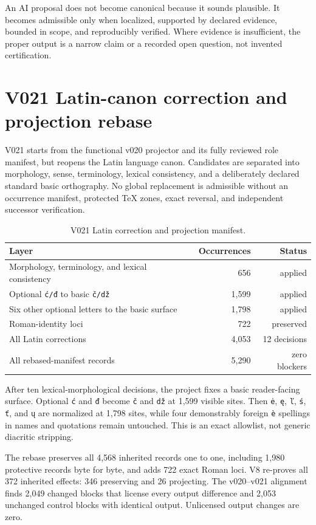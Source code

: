 \documentclass[11pt]{article}
\newcommand{\code}[1]{\texttt{#1}}
\begin{document}
An AI proposal does not become canonical because it sounds plausible. It becomes admissible only when localized, supported by declared evidence, bounded in scope, and reproducibly verified. Where evidence is insufficient, the proper output is a narrow claim or a recorded open question, not invented certification.

\section{V021 Latin-canon correction and projection rebase}

V021 starts from the functional v020 projector and its fully reviewed role manifest, but reopens the Latin language canon. Candidates are separated into morphology, sense, terminology, lexical consistency, and a deliberately declared standard basic orthography. No global replacement is admissible without an occurrence manifest, protected TeX zones, exact reversal, and independent successor verification.

\begin{table}[ht]
\centering
\caption{V021 Latin correction and projection manifest.}\label{tab:en-review}
\begin{tabular}{@{}lrr@{}}
\toprule
Layer & Occurrences & Status\\
\midrule
Morphology, terminology, and lexical consistency & 656 & applied\\
Optional \code{ć/đ} to basic \code{č/dž} & 1,599 & applied\\
Six other optional letters to the basic surface & 1,798 & applied\\
Roman-identity loci & 722 & preserved\\
\midrule
All Latin corrections & 4,053 & 12 decisions\\
All rebased-manifest records & 5,290 & zero blockers\\
\bottomrule
\end{tabular}
\end{table}

After ten lexical-morphological decisions, the project fixes a basic reader-facing surface. Optional \code{ć} and \code{đ} become \code{č} and \code{dž} at 1,599 visible sites. Then \code{ė}, \code{ę}, \code{ľ}, \code{ś}, \code{ť}, and \code{ų} are normalized at 1,798 sites, while four demonstrably foreign \code{è} spellings in names and quotations remain untouched. This is an exact allowlist, not generic diacritic stripping.

The rebase preserves all 4,568 inherited records one to one, including 1,980 protective records byte for byte, and adds 722 exact Roman loci. V8 re-proves all 372 inherited effects: 346 preserving and 26 projecting. The v020--v021 alignment finds 2,049 changed blocks that license every output difference and 2,053 unchanged control blocks with identical output. Unlicensed output changes are zero.
\end{document}
